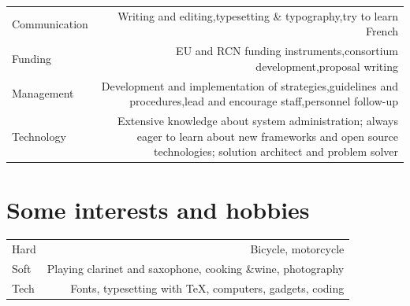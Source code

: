 \documentclass[english,a4paper,11pt]{article}
\begin{document}
\begin{tabular}{LR}
Communication & Writing and editing,typesetting \& typography,try to learn French\\ 
Funding & EU and RCN funding instruments,consortium development,proposal writing\\ 
Management & Development and implementation of strategies,guidelines and procedures,lead and encourage staff,personnel follow-up\\ 
Technology & Extensive knowledge about system administration; always eager to learn about new frameworks and open source technologies; solution architect and problem solver\\ 
\end{tabular}

\section*{Some interests and hobbies}

\begin{tabular}{LR}
Hard & Bicycle, motorcycle\\ 
Soft & Playing clarinet and saxophone, cooking \&wine, photography\\ 
Tech & Fonts, typesetting with \TeX, computers, gadgets, coding\\ 
\end{tabular}
\end{document}
